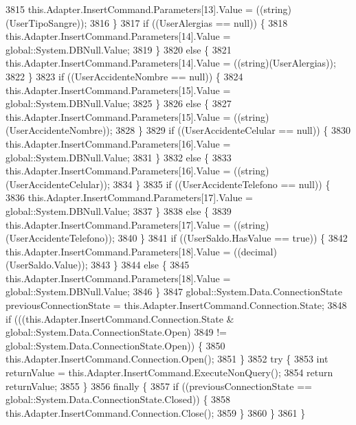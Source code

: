 \begin{DoxyCode}
3815                 this.Adapter.InsertCommand.Parameters[13].Value = ((string)(UserTipoSangre));
3816             \}
3817             \textcolor{keywordflow}{if} ((UserAlergias == null)) \{
3818                 this.Adapter.InsertCommand.Parameters[14].Value = global::System.DBNull.Value;
3819             \}
3820             \textcolor{keywordflow}{else} \{
3821                 this.Adapter.InsertCommand.Parameters[14].Value = ((string)(UserAlergias));
3822             \}
3823             \textcolor{keywordflow}{if} ((UserAccidenteNombre == null)) \{
3824                 this.Adapter.InsertCommand.Parameters[15].Value = global::System.DBNull.Value;
3825             \}
3826             \textcolor{keywordflow}{else} \{
3827                 this.Adapter.InsertCommand.Parameters[15].Value = ((string)(UserAccidenteNombre));
3828             \}
3829             \textcolor{keywordflow}{if} ((UserAccidenteCelular == null)) \{
3830                 this.Adapter.InsertCommand.Parameters[16].Value = global::System.DBNull.Value;
3831             \}
3832             \textcolor{keywordflow}{else} \{
3833                 this.Adapter.InsertCommand.Parameters[16].Value = ((string)(UserAccidenteCelular));
3834             \}
3835             \textcolor{keywordflow}{if} ((UserAccidenteTelefono == null)) \{
3836                 this.Adapter.InsertCommand.Parameters[17].Value = global::System.DBNull.Value;
3837             \}
3838             \textcolor{keywordflow}{else} \{
3839                 this.Adapter.InsertCommand.Parameters[17].Value = ((string)(UserAccidenteTelefono));
3840             \}
3841             \textcolor{keywordflow}{if} ((UserSaldo.HasValue == \textcolor{keyword}{true})) \{
3842                 this.Adapter.InsertCommand.Parameters[18].Value = ((decimal)(UserSaldo.Value));
3843             \}
3844             \textcolor{keywordflow}{else} \{
3845                 this.Adapter.InsertCommand.Parameters[18].Value = global::System.DBNull.Value;
3846             \}
3847             global::System.Data.ConnectionState previousConnectionState = 
      this.Adapter.InsertCommand.Connection.State;
3848             \textcolor{keywordflow}{if} (((this.Adapter.InsertCommand.Connection.State & global::System.Data.ConnectionState.Open) 
3849                         != global::System.Data.ConnectionState.Open)) \{
3850                 this.Adapter.InsertCommand.Connection.Open();
3851             \}
3852             \textcolor{keywordflow}{try} \{
3853                 \textcolor{keywordtype}{int} returnValue = this.Adapter.InsertCommand.ExecuteNonQuery();
3854                 \textcolor{keywordflow}{return} returnValue;
3855             \}
3856             \textcolor{keywordflow}{finally} \{
3857                 \textcolor{keywordflow}{if} ((previousConnectionState == global::System.Data.ConnectionState.Closed)) \{
3858                     this.Adapter.InsertCommand.Connection.Close();
3859                 \}
3860             \}
3861         \}
\end{DoxyCode}
